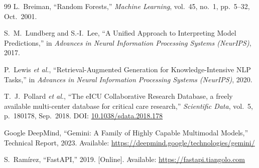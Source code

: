 \documentclass[conference,12pt]{IEEEtran}
\begin{document}
\begin{thebibliography}{99}
L.~Breiman,
``Random Forests,''
\textit{Machine Learning}, vol.~45, no.~1, pp.~5--32, Oct.~2001.

S.~M.~Lundberg and S.-I.~Lee,
``A Unified Approach to Interpreting Model Predictions,''
in \textit{Advances in Neural Information Processing Systems (NeurIPS)}, 2017.

P.~Lewis \textit{et al.},
``Retrieval-Augmented Generation for Knowledge-Intensive NLP Tasks,''
in \textit{Advances in Neural Information Processing Systems (NeurIPS)}, 2020.

T.~J.~Pollard \textit{et al.},
``The eICU Collaborative Research Database, a freely available multi-center
database for critical care research,''
\textit{Scientific Data}, vol.~5, p.~180178, Sep.~2018.
\newblock DOI: \href{https://doi.org/10.1038/sdata.2018.178}{10.1038/sdata.2018.178}

Google DeepMind,
``Gemini: A Family of Highly Capable Multimodal Models,''
Technical Report, 2023.
Available: \url{https://deepmind.google/technologies/gemini/}

S.~Ram\'{i}rez,
``FastAPI,'' 2019.
[Online]. Available: \url{https://fastapi.tiangolo.com}

\end{thebibliography}
\end{document}
